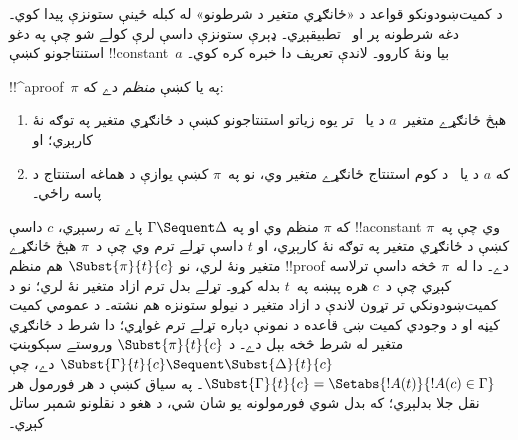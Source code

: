 \documentclass[../../../include/open-logic-section]{subfiles}
\begin{document}


د کميت‌ښودونکو قواعد د «ځانګړي متغير د شرطونو» له کبله ځينې ستونزې پيدا کوي۔ دغه شرطونه پر \LeftR{\lexists} او~\RightR{\lforall} تطبيقېږي۔ ډېرې ستونزې داسې لرې کولے شو چې په دغو استنتاجونو کښې !!{constant}~$a$ بيا ونۀ کاروو۔ لاندې تعريف دا خبره کره کوي۔

\begin{defn}
!!^a{proof}~$\pi$ په  يا  کښې \emph{منظم} دے که:
\begin{enumerate}
  \item هېڅ ځانګړے متغير~$a$ د \LeftR{\lexists} يا~\RightR{\lforall} تر يوه زياتو استنتاجونو کښې د ځانګړي متغير په توګه نۀ کارېږي؛ او
  \item که $a$ د \LeftR{\lexists} يا~\RightR{\lforall} د کوم استنتاج ځانګړے متغير وي، نو په~$\pi$ کښې يوازې د هماغه استنتاج د پاسه راځي۔
\end{enumerate}
\end{defn}

\begin{lem}
که $\pi$ منظم وي او په $\Gamma \Sequent \Delta$ پاے ته رسېږي، $c$ داسې !!a{constant} وي چې په~$\pi$ کښې د ځانګړي متغير په توګه نۀ کارېږي، او $t$ داسې تړلے ترم وي چې د~$\pi$ هېڅ ځانګړے متغير ونۀ لري، نو $\Subst{\pi}{t}{c}$ هم منظم !!{proof} دے۔ دا له~$\pi$ څخه داسې ترلاسه کېږي چې د~$c$ هره پېښه په~$t$ بدله کړو۔ تړلے بدل ترم ازاد متغير نۀ لري؛ نو د کميت‌ښودونکي تر تړون لاندې د ازاد متغير د نيولو ستونزه هم نشته۔ د عمومي کميت کيڼه او د وجودي کميت ښۍ قاعده د نمونې دپاره تړلے ترم غواړي؛ دا شرط د ځانګړي متغير له شرط څخه بېل دے۔
د $\Subst{\pi}{t}{c}$ وروستے سېکوېنټ $\Subst{\Gamma}{t}{c}
\Sequent \Subst{\Delta}{t}{c}$ دے، چې $\Subst{\Gamma}{t}{c} =
\Setabs{!A(t)}{!A(c) \in \Gamma}$۔ په سياق کښې د هر فورمول هر نقل جلا بدلېږي؛ که بدل شوي فورمولونه يو شان شي، د هغو د نقلونو شمېر ساتل کېږي۔
\end{lem}
\end{document}
